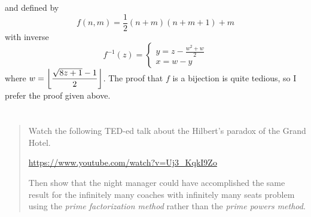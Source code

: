 \documentclass{article}
\begin{document}
and defined by
\[f(n, m) = \frac{1}{2}(n + m)(n + m + 1) + m\]
with inverse
\[f^{-1}(z) = \begin{cases}y = z - \frac{w^2 + w}{2}\\ x = w - y\end{cases}\]
where $\displaystyle w = \floor*{\frac{\sqrt{8z + 1} - 1}{2}}$. The proof that $f$ is a bijection
is quite tedious, so I prefer the proof given above.

\section{}
\begin{quote}
    Watch the following TED-ed talk about the Hilbert's paradox of the Grand
    Hotel.
    \begin{center}
        \url{https://www.youtube.com/watch?v=Uj3_KqkI9Zo}
    \end{center}
    Then show that the night manager could have accomplished the same result
    for the infinitely many coaches with infinitely many seats problem using
    the \textit{prime factorization method} rather than the \textit{prime
        powers method}.
\end{quote}
\end{document}

